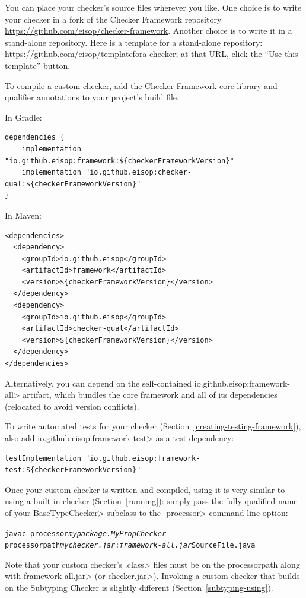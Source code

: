 
You can place your checker's source files wherever you like.
One choice is to write your checker in a fork of the Checker Framework
repository \url{https://github.com/eisop/checker-framework}.
Another choice is to write it in a stand-alone repository.  Here is a
template for a stand-alone repository:
\url{https://github.com/eisop/templatefora-checker}; at that URL,
click the ``Use this template'' button.


To compile a custom checker, add the Checker Framework core library and
qualifier annotations to your project's build file.

In Gradle:
\begin{Verbatim}
dependencies {
    implementation "io.github.eisop:framework:${checkerFrameworkVersion}"
    implementation "io.github.eisop:checker-qual:${checkerFrameworkVersion}"
}
\end{Verbatim}

In Maven:
\begin{Verbatim}
<dependencies>
  <dependency>
    <groupId>io.github.eisop</groupId>
    <artifactId>framework</artifactId>
    <version>${checkerFrameworkVersion}</version>
  </dependency>
  <dependency>
    <groupId>io.github.eisop</groupId>
    <artifactId>checker-qual</artifactId>
    <version>${checkerFrameworkVersion}</version>
  </dependency>
</dependencies>
\end{Verbatim}

Alternatively, you can depend on the self-contained
\<io.github.eisop:framework-all> artifact, which bundles the core framework
and all of its dependencies (relocated to avoid version conflicts).

To write automated tests for your checker
(Section~\ref{creating-testing-framework}), also add
\<io.github.eisop:framework-test> as a test dependency:
\begin{Verbatim}
testImplementation "io.github.eisop:framework-test:${checkerFrameworkVersion}"
\end{Verbatim}


Once your custom checker is written and compiled, using it is very similar to
using a built-in checker (Section~\ref{running}):
simply pass the fully-qualified name of your \<BaseTypeChecker>
subclass to the \<-processor> command-line option:
\begin{alltt}
  javac -processor \textit{mypackage.MyPropChecker} -processorpath \textit{mychecker.jar}:\textit{framework-all.jar} SourceFile.java
\end{alltt}
Note that your custom checker's \<.class> files must be on the processorpath
along with \<framework-all.jar> (or \<checker.jar>).
Invoking a custom checker that builds on
the Subtyping Checker is slightly different (Section~\ref{subtyping-using}).



